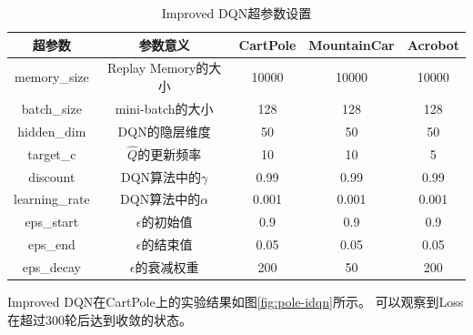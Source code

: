 \documentclass[a4paper,UTF8]{article}
\theoremstyle{definition}
\begin{document}
\begin{table}[H]
	\centering
	\caption{Improved DQN超参数设置}\label{tab:arg-idqn}
	\begin{tabular}{ccccc}
		\toprule
		超参数 & 参数意义 & CartPole & MountainCar & Acrobot \\
		\midrule
		memory\_size & Replay Memory的大小 & 10000 & 10000 & 10000 \\
		batch\_size & mini-batch的大小 & 128 & 128 & 128 \\
		hidden\_dim & DQN的隐层维度 & 50 & 50 & 50 \\
		target\_c & $\hat{Q}$的更新频率 & 10 & 10 & 5 \\
		discount & DQN算法中的$\gamma$ & 0.99 & 0.99 & 0.99 \\
		learning\_rate & DQN算法中的$\alpha$ & 0.001 & 0.001 & 0.001 \\
		eps\_start & $\epsilon$的初始值 & 0.9 & 0.9 & 0.9 \\
		eps\_end & $\epsilon$的结束值 & 0.05 & 0.05 & 0.05 \\
		eps\_decay & $\epsilon$的衰减权重 & 200 & 50 & 200 \\
		\bottomrule
	\end{tabular}
\end{table}

Improved DQN在CartPole上的实验结果如图\ref{fig:pole-idqn}所示。
可以观察到Loss在超过300轮后达到收敛的状态。
\end{document}
